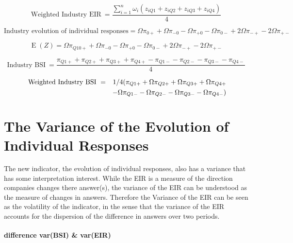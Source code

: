 \documentclass[12pt,a4paper,oneside]{book}
\DeclareMathOperator{\E}{E}
\begin{document}
\begin{equation}
    \mbox{Weighted Industry EIR}\ = \frac{ \sum_{i=1}^n \omega_i \left(z_{i Q1} + z_{i Q2} + z_{i Q3} + z_{i Q4} \right)}{4}
\end{equation}


\begin{equation}
    \text{Industry evolution of individual responses} = \Omega \pi_{0+} + \Omega \pi_{-0} - \Omega \pi_{+0} - \Omega \pi_{0-} +2\Omega \pi_{-+} -2\Omega \pi_{+-} 
\end{equation}


\begin{equation}
    \E(Z) = \Omega \pi_{Q1 0+} + \Omega \pi_{-0} - \Omega \pi_{+0} - \Omega \pi_{0-} +2\Omega \pi_{-+} -2\Omega \pi_{+-} 
\end{equation}



\begin{equation}
    \mbox{Industry BSI}\ = \frac{\pi_{Q1+} + \pi_{Q2+} + \pi_{Q3+} + \pi_{Q4+} - \pi_{Q1-} - \pi_{Q2-} - \pi_{Q3-} - \pi_{Q4-} }{4}
\end{equation}


\begin{eqnarray}
    \mbox{ Weighted Industry BSI}\ &=& 1/4 ( \pi_{Q1+} + \Omega \pi_{Q2+} + \Omega \pi_{Q3+} + \Omega \pi_{Q4+} \\
    && - \Omega \pi_{Q1-} - \Omega \pi_{Q2-} - \Omega \pi_{Q3-} - \Omega \pi_{Q4-} \Large) 
\end{eqnarray}



\chapter{The Variance of the Evolution of Individual Responses} \label{Chapter:Var Z}

The new indicator, the evolution of individual responses, also has a variance that has some interpretation interest. 
While the EIR is a measure of the direction companies changes there answer(s), the variance of the EIR can be understood as the measure of changes in answers. Therefore the Variance of the EIR can be seen as the volatility of the indicator, in the sense that the variance of the EIR accounts for the dispersion of the difference in answers over two periods.

\subsubsection{difference var(BSI) \& var(EIR)}
\end{document}
